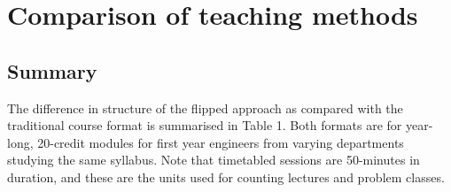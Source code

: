 \documentclass{amsart}
\begin{document}
%

\section{Comparison of teaching methods}

\subsection{Summary}

The difference in structure of the flipped approach as compared with the traditional course format is summarised in Table 1.  Both formats are for year-long, 20-credit modules for first year engineers from varying departments studying the same syllabus.  Note that timetabled sessions are 50-minutes in duration, and these are the units used for counting lectures and problem classes.
\end{document}
